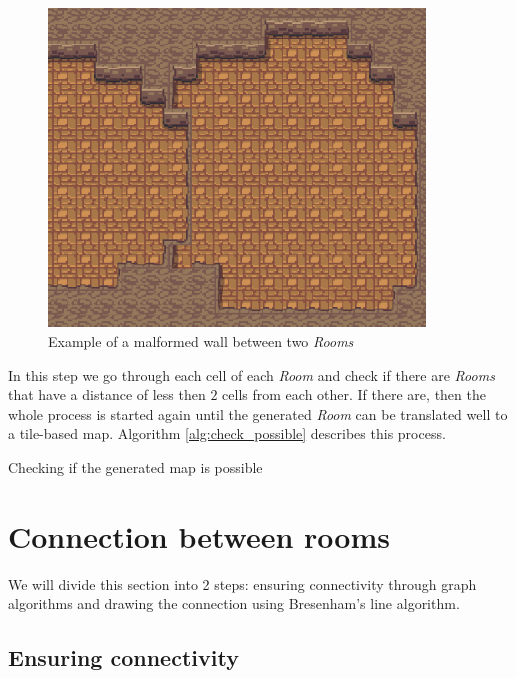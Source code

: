 \begin{figure}[h]
    \caption{Example of a malformed wall between two \emph{Rooms}}
    \centerline{\includegraphics[width=10cm]{images/development/deformed_wall.png}}
    \label{fig:malformed_wall}
\end{figure}

In this step we go through each cell of each \emph{Room} and check if there are \emph{Rooms} that have a distance of less then \(2\) cells from each other. If there are, then the whole process is started again until the generated \emph{Room} can be translated well to a tile-based map. Algorithm \ref{alg:check_possible} describes this process.

\begin{algorithm}[h]
 \DontPrintSemicolon
 \caption{Checking if the generated map is possible}
\label{alg:check_possible}
\end{algorithm} 

\section{Connection between rooms}
\label{sec:connection}

We will divide this section into 2 steps: ensuring connectivity through graph algorithms and drawing the connection using Bresenham's line algorithm.

\subsection{Ensuring connectivity}

